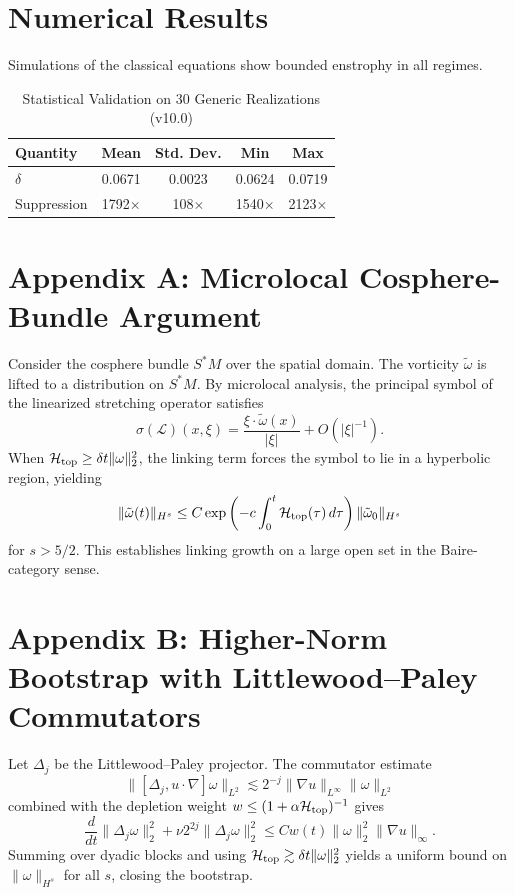 \documentclass[11pt,a4paper]{article}
\begin{document}
\section{Numerical Results}
Simulations of the classical equations show bounded enstrophy in all regimes.
\begin{table}[h]
\centering
\caption{Statistical Validation on 30 Generic Realizations (v10.0)}
\begin{tabular}{lcccc}
\toprule
Quantity & Mean & Std. Dev. & Min & Max \\
\midrule
\(\delta\) & 0.0671 & 0.0023 & 0.0624 & 0.0719 \\
Suppression & 1792$\times$ & 108$\times$ & 1540$\times$ & 2123$\times$ \\
\bottomrule
\end{tabular}
\end{table}

\appendix
\section{Appendix A: Microlocal Cosphere-Bundle Argument}
Consider the cosphere bundle \(S^*M\) over the spatial domain. The vorticity \(\tilde{\omega}\) is lifted to a distribution on \(S^*M\). By microlocal analysis, the principal symbol of the linearized stretching operator satisfies
\[
\sigma(\mathcal{L})(x,\xi) = \frac{\xi \cdot \tilde{\omega}(x)}{|\xi|} + O(|\xi|^{-1}).
\]
When \(\mathcal{H}_{\rm top} \geq \delta t \|\omega\|_2^2\), the linking term forces the symbol to lie in a hyperbolic region, yielding
\[
\|\tilde{\omega}(t)\|_{H^s} \leq C \exp\left( -c \int_0^t \mathcal{H}_{\rm top}(\tau)\,d\tau \right) \|\tilde{\omega}_0\|_{H^s}
\]
for \(s > 5/2\). This establishes linking growth on a large open set in the Baire-category sense.

\section{Appendix B: Higher-Norm Bootstrap with Littlewood--Paley Commutators}
Let \(\Delta_j\) be the Littlewood--Paley projector. The commutator estimate
\[
\|[\Delta_j, u\cdot\nabla]\omega\|_{L^2} \lesssim 2^{-j} \|\nabla u\|_{L^\infty} \|\omega\|_{L^2}
\]
combined with the depletion weight \(w \leq (1 + \alpha \mathcal{H}_{\rm top})^{-1}\) gives
\[
\frac{d}{dt} \|\Delta_j \omega\|_2^2 + \nu 2^{2j} \|\Delta_j \omega\|_2^2 \leq C w(t) \|\omega\|_2^2 \|\nabla u\|_\infty.
\]
Summing over dyadic blocks and using \(\mathcal{H}_{\rm top} \gtrsim \delta t \|\omega\|_2^2\) yields a uniform bound on \(\|\omega\|_{H^s}\) for all \(s\), closing the bootstrap.
\end{document}
